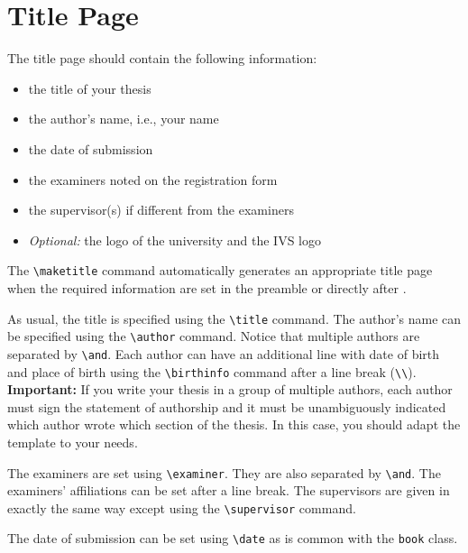 \section{Title Page} \label{sec:title-page} 

The title page should contain the following information: 
\begin{itemize} 
	\item the title of your thesis
	\item the author's name, i.e., your name
	\item the date of submission 
	\item the examiners noted on the registration form
	\item the supervisor(s) if different from the examiners 
	\item \emph{Optional:} the logo of the university and the IVS logo 
\end{itemize}
The \verb|\maketitle| command automatically generates an appropriate title page when the required information are set in the preamble or directly after \verb||. 

As usual, the title is specified using the \verb|\title| command. The author's name can be specified using the \verb|\author| command. Notice that multiple authors are separated by \verb|\and|. Each author can have an additional line with date of birth and place of birth using the \verb|\birthinfo| command after a line break (\verb|\\|). \textbf{Important:} If you write your thesis in a group of multiple authors, each author must sign the statement of authorship and it must be unambiguously indicated which author wrote which section of the thesis. In this case, you should adapt the template to your needs. 

The examiners are set using \verb|\examiner|. They are also separated by \verb|\and|. The examiners' affiliations can be set after a line break. The supervisors are given in exactly the same way except using the \verb|\supervisor| command. 

The date of submission can be set using \verb|\date| as is common with the \texttt{book} class. 
